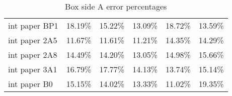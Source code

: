 \documentclass[11pt, twoside, reqno]{book}
\begin{document}
\begin{table}[]
\begin{tabular}{llllll}
		int paper BP1       & 18.19\%          & 15.22\%          & 13.09\%          & 18.72\%          & 13.59\%          \\
		int paper 2A5       & 11.67\%          & 11.61\%          & 11.21\%          & 14.35\%          & 14.29\%          \\
		int paper 2A8       & 14.49\%          & 14.20\%          & 13.05\%          & 14.98\%          & 15.66\%          \\
		int paper 3A1       & 16.79\%          & 17.77\%          & 14.13\%          & 13.74\%          & 15.14\%          \\
		int paper B0        & 15.15\%          & 14.02\%          & 13.33\%          & 11.02\%          & 19.35\%         
	\end{tabular}
\caption{Box side A error percentages}
\end{table}
\end{document}
